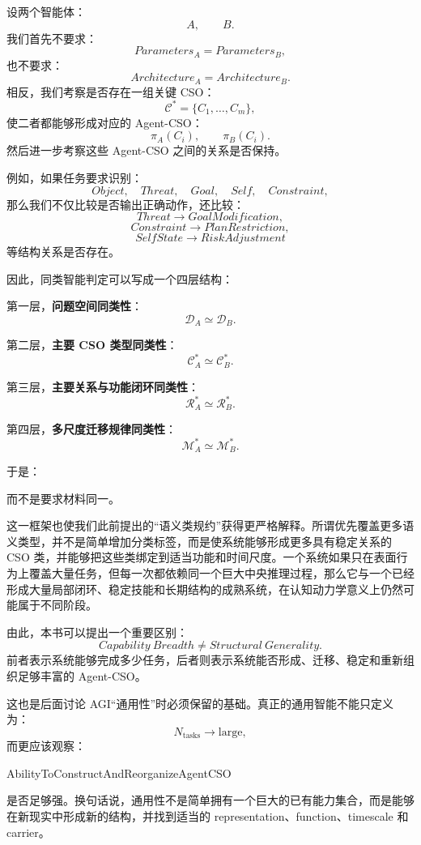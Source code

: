设两个智能体：
\[
A,\qquad B.
\]
我们首先不要求：
\[
Parameters_A
=
Parameters_B,
\]
也不要求：
\[
Architecture_A
=
Architecture_B.
\]
相反，我们考察是否存在一组关键 CSO：
\[
\mathcal C^\ast
=
\{C_1,\ldots,C_m\},
\]
使二者都能够形成对应的 Agent-CSO：
\[
\pi_A(C_i),
\qquad
\pi_B(C_i).
\]
然后进一步考察这些 Agent-CSO 之间的关系是否保持。

例如，如果任务要求识别：
\[
Object,
\quad
Threat,
\quad
Goal,
\quad
Self,
\quad
Constraint,
\]
那么我们不仅比较是否输出正确动作，还比较：
\[
Threat
\rightarrow
GoalModification,
\]
\[
Constraint
\rightarrow
PlanRestriction,
\]
\[
SelfState
\rightarrow
RiskAdjustment
\]
等结构关系是否存在。

因此，同类智能判定可以写成一个四层结构：

第一层，\textbf{问题空间同类性}：
\[
\mathcal D_A
\simeq
\mathcal D_B.
\]

第二层，\textbf{主要 CSO 类型同类性}：
\[
\mathcal C_A^\ast
\simeq
\mathcal C_B^\ast.
\]

第三层，\textbf{主要关系与功能闭环同类性}：
\[
\mathcal R_A^\ast
\simeq
\mathcal R_B^\ast.
\]

第四层，\textbf{多尺度迁移规律同类性}：
\[
\mathcal M_A^\ast
\simeq
\mathcal M_B^\ast.
\]

于是：
\begin{statementbox}
\centering
{}
\end{statementbox}
而不是要求材料同一。

这一框架也使我们此前提出的“语义类规约”获得更严格解释。所谓优先覆盖更多语义类型，并不是简单增加分类标签，而是使系统能够形成更多具有稳定关系的 CSO 类，并能够把这些类绑定到适当功能和时间尺度。一个系统如果只在表面行为上覆盖大量任务，但每一次都依赖同一个巨大中央推理过程，那么它与一个已经形成大量局部闭环、稳定技能和长期结构的成熟系统，在认知动力学意义上仍然可能属于不同阶段。

由此，本书可以提出一个重要区别：
\[
\boxed{
Capability\ Breadth
\neq
Structural\ Generality.
}
\]
前者表示系统能够完成多少任务，后者则表示系统能否形成、迁移、稳定和重新组织足够丰富的 Agent-CSO。

这也是后面讨论 AGI“通用性”时必须保留的基础。真正的通用智能不能只定义为：
\[
N_{\text{tasks}}\rightarrow\text{large},
\]
而更应该观察：
\begin{statementbox}
AbilityToConstructAndReorganizeAgentCSO
\end{statementbox}
是否足够强。换句话说，通用性不是简单拥有一个巨大的已有能力集合，而是能够在新现实中形成新的结构，并找到适当的 representation、function、timescale 和 carrier。

